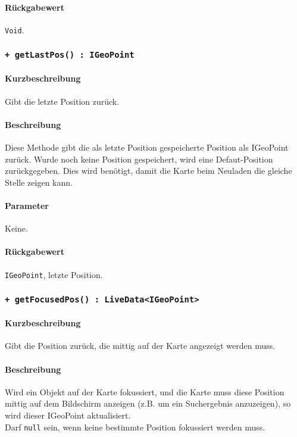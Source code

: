 \paragraph*{Rückgabewert}
\texttt{Void}.

\subsubsection*{\texttt{+ getLastPos() : IGeoPoint}}\label{App_Map_ViewModel_getLastPos}%
\paragraph*{Kurzbeschreibung}
Gibt die letzte Position zurück.
\paragraph*{Beschreibung}
Diese Methode gibt die als letzte Position gespeicherte Position als IGeoPoint zurück.
Wurde noch keine Position gespeichert, wird eine Defaut-Position zurückgegeben.
Dies wird benötigt, damit die Karte beim Neuladen die gleiche Stelle zeigen kann.
\paragraph*{Parameter}
Keine.
\paragraph*{Rückgabewert}
\texttt{IGeoPoint}, letzte Position.

\subsubsection*{\texttt{+ getFocusedPos() : LiveData<IGeoPoint>}}\label{App_Map_ViewModel_getFocusedPos}%
\paragraph*{Kurzbeschreibung}
Gibt die Position zurück, die mittig auf der Karte angezeigt werden muss.
\paragraph*{Beschreibung}
Wird ein Objekt auf der Karte fokussiert, und die Karte muss diese Position mittig auf dem 
Bildschirm anzeigen (z.B. um ein Suchergebnis anzuzeigen), so wird dieser IGeoPoint aktualisiert.\\
Darf \texttt{null} sein, wenn keine bestimmte Position fokussiert werden muss.
